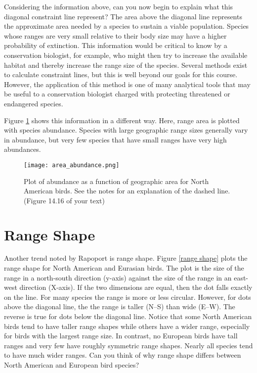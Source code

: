 \documentclass[11pt, hidelinks]{article}
\begin{document}
Considering the information above, can you now begin to explain what this diagonal constraint line represent?  The area above the diagonal line represents the approximate area needed by a species to sustain a viable population.  Species whose ranges are very small relative to their body size may have a higher probability of extinction.  This information would be critical to know by a conservation biologist, for example, who might then try to increase the available habitat and thereby increase the range size of the species.  Several methods exist to calculate constraint lines, but this is well beyond our goals for this course.  However, the application of this method is one of many analytical tools that may be useful to a conservation biologist charged with protecting threatened or endangered species.

Figure \ref{area and abundance} shows this information in a different way.  Here, range area is plotted with species abundance.  Species with large geographic range sizes generally vary in abundance, but very few species that have small ranges have very high abundances.

\begin{figure}[tb]
	\centering
		\texttt{[image: area\_abundance.png]}  
		\caption{Plot of abundance as a function of geographic area for North American birds.  See the notes for an explanation of the dashed line. (Figure 14.16 of your text) \label{area and abundance}}
\end{figure}

\section{Range Shape}

Another trend noted by Rapoport is range shape.  Figure \ref{range shape} plots the range shape for North American and Eurasian birds.  The plot is the size of the range in a north-south direction (y-axis) against the size of the range in an east-west direction (X-axis). If the two dimensions are equal, then the dot falls exactly on the line.  For many species the range is more or less circular.  However, for dots above the diagonal line, the the range is taller (N--S) than wide (E--W).  The reverse is true for dots below the diagonal line.  Notice that some North American birds tend to have taller range shapes while others have a wider range, especially for birds with the largest range size.  In contrast, no European birds have tall ranges and very few have roughly symmetric range shapes. Nearly all species tend to have much wider ranges.  Can you think of why range shape differs between North American and European bird species?
\end{document}
